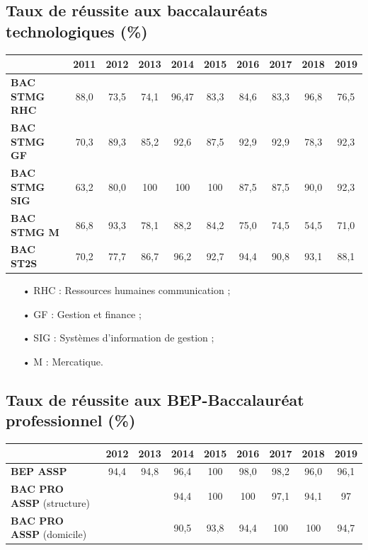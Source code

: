 \documentclass[12pt,a4paper]{article}
\begin{document}
\subsection{Taux de réussite aux baccalauréats technologiques (\%)}

\begin{center}
\begin{tabular}{l|c|c|c|c|c|c|c|c|c}
		& \textbf{2011} & \textbf{2012} & \textbf{2013} & \textbf{2014} & \textbf{2015} & \textbf{2016} & \textbf{2017} & \textbf{2018} & \textbf{2019} \\
\hline \hline
\textbf{BAC STMG RHC} 		& 88{,}0 & 73{,}5 & 74{,}1 & 96{,}47 & 83{,}3 & 84{,}6 & 83{,}3 & 96{,}8 & 76{,}5 \\
\hline
\textbf{BAC STMG GF}  & 70{,}3 & 89{,}3 & 85{,}2 & 92{,}6 & 87{,}5 & 92{,}9 & 92{,}9 & 78{,}3 & 92{,}3 \\
\hline
\textbf{BAC STMG SIG}		& 63{,}2 & 80{,}0 & 100 & 100 & 100 & 87{,}5 & 87{,}5 & 90{,}0 & 92{,}3 \\
\hline
\textbf{BAC STMG M} & 86{,}8 & 93{,}3 & 78{,}1 & 88{,}2 & 84{,}2 & 75{,}0 & 74{,}5 & 54{,}5 & 71{,}0 \\
\hline
\textbf{BAC ST2S} & 70{,}2 & 77{,}7 & 86{,}7 & 96{,}2 & 92{,}7 & 94{,}4 & 90{,}8 & 93{,}1 & 88{,}1 \\
\end{tabular}
\end{center}

\begin{itemize}
\item[•] RHC : Ressources humaines communication ;
\item[•] GF : Gestion et finance ;
\item[•] SIG : Systèmes d'information de gestion ;
\item[•] M : Mercatique.
\end{itemize}

\subsection{Taux de réussite aux BEP-Baccalauréat professionnel (\%)}

\begin{center}
\begin{tabular}{l|c|c|c|c|c|c|c|c}
		& \textbf{2012} & \textbf{2013} & \textbf{2014} & \textbf{2015} & \textbf{2016} & \textbf{2017} & \textbf{2018} & \textbf{2019} \\
\hline \hline
\textbf{BEP ASSP} 		& 94{,}4 & 94{,}8 & 96{,}4 & 100 & 98{,}0 & 98{,}2 & 96{,}0 & 96{,}1 \\
\hline
\textbf{BAC PRO ASSP} (structure) 	& & & 94{,}4 & 100 & 100 & 97{,}1 & 94{,}1 & 97 \\
\hline
\textbf{BAC PRO ASSP}	(domicile)	& & & 90{,}5 & 93{,}8 & 94{,}4 & 100 & 100 & 94{,}7 \\
\end{tabular}
\end{center}
\end{document}

